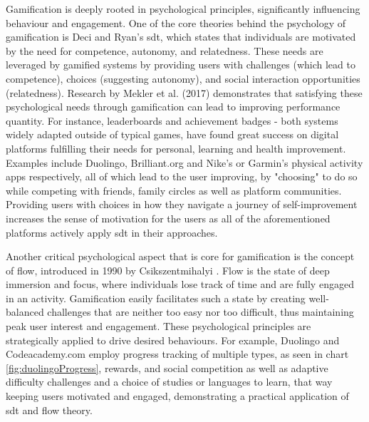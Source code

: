 Gamification is deeply rooted in psychological principles, significantly influencing behaviour and engagement. 
One of the core theories behind the psychology of gamification is Deci and Ryan's \acrshort{sdt}, \cite{sdt}which states that individuals are motivated by the need for competence, autonomy, and relatedness. 
These needs are leveraged by gamified systems by providing users with challenges (which lead to competence), choices (suggesting autonomy), and social interaction opportunities (relatedness). 
Research by Mekler et al. (2017) \cite{MEKLER2017525}demonstrates that satisfying these psychological needs through gamification can lead to improving performance quantity. 
For instance, leaderboards and achievement badges - both systems widely adapted outside of typical games, have found great success on digital platforms fulfilling their needs for personal, learning and health improvement. 
Examples include Duolingo, Brilliant.org and Nike's or Garmin's physical activity apps respectively, all of which lead to the user improving, by "choosing" to do so while competing with friends, family circles as well as platform communities. 
Providing users with choices in how they navigate a journey of self-improvement increases the sense of motivation for the users as all of the aforementioned platforms actively apply \acrshort{sdt} in their approaches.

Another critical psychological aspect that is core for gamification is the concept of flow, introduced in 1990 by Csikszentmihalyi \cite{flow}. 
Flow is the state of deep immersion and focus, where individuals lose track of time and are fully engaged in an activity. 
Gamification easily facilitates such a state by creating well-balanced challenges that are neither too easy nor too difficult, thus maintaining peak user interest and engagement. 
These psychological principles are strategically applied to drive desired behaviours. 
For example, Duolingo and Codeacademy.com employ progress tracking of multiple types, as seen in chart \ref{fig:duolingoProgress}, rewards, and social competition as well as adaptive difficulty challenges and a choice of studies or languages to learn, that way keeping users motivated and engaged, demonstrating a practical application of \acrshort{sdt} and flow theory.

